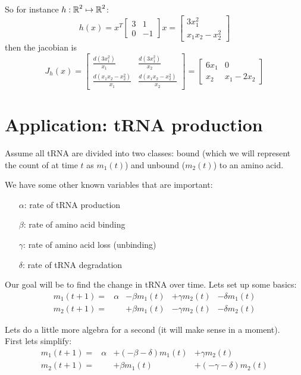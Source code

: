 So for instance $h:\operatorname{\mathbb{R}}^2\mapsto\operatorname{\mathbb{R}}^2$:
\[h(x) = x^T\begin{bmatrix}3 & 1\\0 & -1\end{bmatrix}x = \begin{bmatrix}3x_1^2\\x_1x_2 -x_2^2\end{bmatrix}\]
then the jacobian is 
\[J_h(x) = \begin{bmatrix} 
\frac{d(3x_1^2)}{x_1} & \frac{d(3x_1^2)}{x_2}\\
\frac{d(x_1x_2 -x_2^2)}{x_1} & \frac{d(x_1x_2 -x_2^2)}{x_2}\end{bmatrix} = 
\begin{bmatrix} 
6x_1 & 0\\
x_2 & x_1-2x_2
\end{bmatrix}
\]


\iffalse
\section{Application: tRNA production}
Assume all tRNA are divided into two classes: bound (which we will represent the count of at time $t$ as $m_1(t)$) 
and unbound ($m_2(t)$) to an amino acid.

We have some other known variables that are important: 
\begin{itemize}
\item[$\alpha$:] rate of tRNA production
\item[$\beta$:] rate of amino acid binding
\item[$\gamma$:]rate of amino acid loss (unbinding)
\item[$\delta$:] rate of tRNA degradation
\end{itemize}

Our goal will be to find the change in tRNA over time. 
Lets set up some basics:
\[\begin{array}{rrrrr}
m_1(t+1) =&\alpha &- \beta m_1(t)& + \gamma m_2(t)& - \delta m_1(t)\\
m_2(t+1) = & &+ \beta m_1(t) &- \gamma m_2(t)& - \delta m_2(t)
\end{array}\]

Lets do a little more algebra for a second (it will make sense in a moment). \\
First lets simplify: 
\[\begin{array}{rrrrr}
m_1(t+1) =&\alpha &+(- \beta-\delta) m_1(t)& + \gamma m_2(t)\\
m_2(t+1) = & &+ \beta m_1(t) & +(-\gamma- \delta) m_2(t)
\end{array}\]

